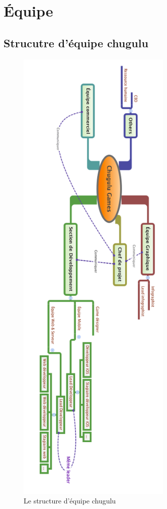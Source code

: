 \section{Équipe} %
\label{sec:Équipe}


\subsection{Strucutre d'équipe chugulu} %
\label{sub:strucutre_d_équipe_chugulu}


\begin{figure}[htbp]
	\centering
		\includegraphics[height=9in]{XMinds/EquipeChuguluGames.png}
	\caption{Le structure d'équipe chugulu}
	\label{fig:XMinds_EquipeChuguluGames}
\end{figure}


